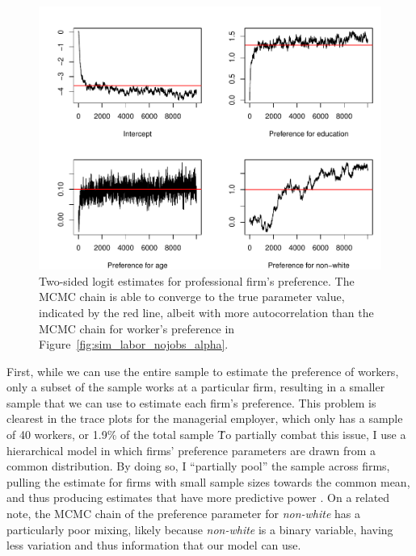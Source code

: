\begin{figure}[!ht]
  \centering
  \includegraphics[width=\textwidth,keepaspectratio]{../figure/sim_labor_nojobs_beta_emp2}
  \caption[Simulation, estimates for professional firm's preference.]{Two-sided logit estimates for professional firm's preference. The
    MCMC chain is able to converge to the true parameter value, indicated by the
  red line, albeit with more autocorrelation than the MCMC chain for worker's
  preference in Figure~\ref{fig:sim_labor_nojobs_alpha}.}
  \label{fig:sim_labor_nojobs_beta_emp2}
\end{figure}

First, while we can use the entire sample to estimate the preference of
workers, only a subset of the sample works at a particular firm, resulting in a
smaller sample that we can use to estimate each firm's preference. This problem
is clearest in the trace plots for the managerial employer, which only has a
sample of 40 workers, or 1.9\% of the total sample \. To partially
combat this issue, I use a hierarchical model in which firms' preference
parameters are drawn from a common distribution. By doing so, I ``partially
pool'' the sample across firms, pulling the estimate for firms with small sample
sizes towards the common mean, and thus producing estimates that have more
predictive power \citep{Gelman2006}. On a related note, the MCMC chain of the
preference parameter for \textit{non-white} has a particularly poor mixing,
likely because \textit{non-white} is a binary variable, having less variation
and thus information that our model can use.

